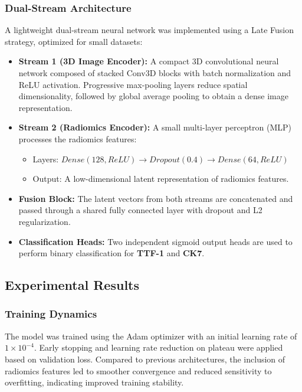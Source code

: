 \subsubsection{Dual-Stream Architecture}
A lightweight dual-stream neural network was implemented using a Late Fusion strategy, optimized for small datasets:

\begin{itemize}
    \item \textbf{Stream 1 (3D Image Encoder):} A compact 3D convolutional neural network composed of stacked Conv3D blocks with batch normalization and ReLU activation. Progressive max-pooling layers reduce spatial dimensionality, followed by global average pooling to obtain a dense image representation.
    \item \textbf{Stream 2 (Radiomics Encoder):} A small multi-layer perceptron (MLP) processes the radiomics features:
    \begin{itemize}
        \item Layers: $Dense(128, ReLU) \rightarrow Dropout(0.4) \rightarrow Dense(64, ReLU)$
        \item Output: A low-dimensional latent representation of radiomics features.
    \end{itemize}
    \item \textbf{Fusion Block:} The latent vectors from both streams are concatenated and passed through a shared fully connected layer with dropout and L2 regularization.
    \item \textbf{Classification Heads:} Two independent sigmoid output heads are used to perform binary classification for \textbf{TTF-1} and \textbf{CK7}.
\end{itemize}

\subsection{Experimental Results}

\subsubsection{Training Dynamics}
The model was trained using the Adam optimizer with an initial learning rate of $1 \times 10^{-4}$. Early stopping and learning rate reduction on plateau were applied based on validation loss. Compared to previous architectures, the inclusion of radiomics features led to smoother convergence and reduced sensitivity to overfitting, indicating improved training stability.

